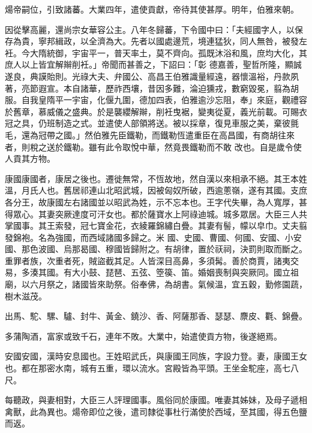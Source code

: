 \begin{pinyinscope}
 煬帝嗣位，引致諸蕃。大業四年，遣使貢獻，帝待其使甚厚。明年，伯雅來朝。



 因從擊高麗，還尚宗女華容公主。八年冬歸蕃，下令國中曰：「夫經國字人，以保存為貴，寧邦緝政，以全濟為大。先者以國處邊荒，境連猛狄，同人無咎，被發左衽。今大隋統御，宇宙平一，普天率土，莫不齊向。孤既沐浴和風，庶均大化，其庶人以上皆宜解辮削衽。」帝聞而甚善之，下詔曰：「彰
 德嘉善，聖哲所隆，顯誠遂良，典謨貽則。光祿大夫、弁國公、高昌王伯雅識量經遠，器懷溫裕，丹款夙著，亮節遐宣。本自諸華，歷祚西壤，昔因多難，淪迫獯戎，數窮毀冕，翦為胡服。自我皇隋平一宇宙，化偃九圍，德加四表，伯雅逾沙忘阻，奉」來庭，觀禮容於舊章，慕威儀之盛典。於是襲纓解辮，削衽曳裾，變夷從夏，義光前載。可賜衣冠之具，仍班制造之式。並遣使人部領將送。被以採章，復見車服之美，棄彼氈毛，還為冠帶之國。」然伯雅先臣鐵勒，而鐵勒恆遣重臣在高昌國，有商胡往來者，則稅之送於鐵勒。雖有此令取悅中華，然竟畏鐵勒而不敢
 改也。自是歲令使人貢其方物。



 康國康國者，康居之後也。遷徙無常，不恆故地，然自漢以來相承不絕。其王本姓溫，月氏人也。舊居祁連山北昭武城，因被匈奴所破，西逾蔥嶺，遂有其國。支庶各分王，故康國左右諸國並以昭武為姓，示不忘本也。王字代失畢，為人寬厚，甚得眾心。其妻突厥達度可汗女也。都於薩寶水上阿祿迪城。城多眾居。大臣三人共掌國事。其王索發，冠七寶金花，衣綾羅錦繡白疊。其妻有髻，幪以皁巾。丈夫翦發錦袍。名為強國，而西域諸國多歸之。米
 國、史國、曹國、何國、安國、小安國、那色波國、烏那曷國、穆國皆歸附之。有胡律，置於祆祠，決罰則取而斷之。重罪者族，次重者死，賊盜截其足。人皆深目高鼻，多須髯。善於商賈，諸夷交易，多湊其國。有大小鼓、琵琶、五弦、箜篌、笛。婚姻喪制與突厥同。國立祖廟，以六月祭之，諸國皆來助祭。俗奉佛，為胡書。氣候溫，宜五穀，勤修園蔬，樹木滋茂。



 出馬、駝、騾、驢、封牛、黃金、鐃沙、香、阿薩那香、瑟瑟、麖皮、氍、錦疊。



 多蒲陶酒，富家或致千石，連年不敗。大業中，始遣使貢方物，後遂絕焉。



 安國安國，漢時安息國也。王姓昭武氏，與康國王同族，字設力登。妻，康國王女也。都在那密水南，城有五重，環以流水。宮殿皆為平頭。王坐金駝座，高七八尺。



 每聽政，與妻相對，大臣三人評理國事。風俗同於康國。唯妻其姊妹，及母子遞相禽獸，此為異也。煬帝即位之後，遣司隸從事杜行滿使於西域，至其國，得五色鹽而返。




\end{pinyinscope}
